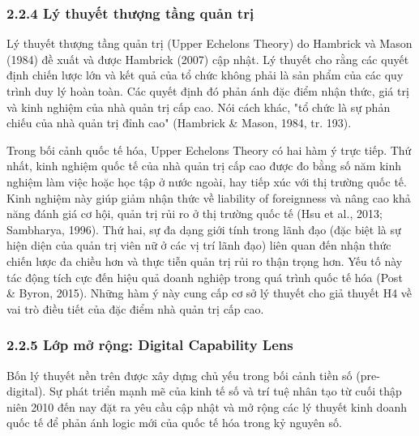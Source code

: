 \documentclass[12pt,a4paper]{article}
\begin{document}
\hypertarget{224-luxfd-thuyux1ebft-thux1b0ux1ee3ng-tux1ea7ng-quux1ea3n-trux1ecb}{%
\subsubsection{2.2.4 Lý thuyết thượng tầng quản
trị}\label{224-luxfd-thuyux1ebft-thux1b0ux1ee3ng-tux1ea7ng-quux1ea3n-trux1ecb}}

Lý thuyết thượng tầng quản trị (Upper Echelons Theory) do Hambrick và
Mason (1984) đề xuất và được Hambrick (2007) cập nhật. Lý thuyết cho
rằng các quyết định chiến lược lớn và kết quả của tổ chức không phải là
sản phẩm của các quy trình duy lý hoàn toàn. Các quyết định đó phản ánh
đặc điểm nhận thức, giá trị và kinh nghiệm của nhà quản trị cấp cao. Nói
cách khác, "tổ chức là sự phản chiếu của nhà quản trị đỉnh cao"
(Hambrick \& Mason, 1984, tr. 193).

Trong bối cảnh quốc tế hóa, Upper Echelons Theory có hai hàm ý trực
tiếp. Thứ nhất, kinh nghiệm quốc tế của nhà quản trị cấp cao được đo
bằng số năm kinh nghiệm làm việc hoặc học tập ở nước ngoài, hay tiếp xúc
với thị trường quốc tế. Kinh nghiệm này giúp giảm nhận thức về liability
of foreignness và nâng cao khả năng đánh giá cơ hội, quản trị rủi ro ở
thị trường quốc tế (Hsu et al., 2013; Sambharya, 1996). Thứ hai, sự đa
dạng giới tính trong lãnh đạo (đặc biệt là sự hiện diện của quản trị
viên nữ ở các vị trí lãnh đạo) liên quan đến nhận thức chiến lược đa
chiều hơn và thực tiễn quản trị rủi ro thận trọng hơn. Yếu tố này tác
động tích cực đến hiệu quả doanh nghiệp trong quá trình quốc tế hóa
(Post \& Byron, 2015). Những hàm ý này cung cấp cơ sở lý thuyết cho giả
thuyết H4 về vai trò điều tiết của đặc điểm nhà quản trị cấp cao.

\hypertarget{225-lux1edbp-mux1edf-rux1ed9ng-digital-capability-lens}{%
\subsubsection{2.2.5 Lớp mở rộng: Digital Capability
Lens}\label{225-lux1edbp-mux1edf-rux1ed9ng-digital-capability-lens}}

Bốn lý thuyết nền trên được xây dựng chủ yếu trong bối cảnh tiền số
(pre-digital). Sự phát triển mạnh mẽ của kinh tế số và trí tuệ nhân tạo
từ cuối thập niên 2010 đến nay đặt ra yêu cầu cập nhật và mở rộng các lý
thuyết kinh doanh quốc tế để phản ánh logic mới của quốc tế hóa trong kỷ
nguyên số.
\end{document}
